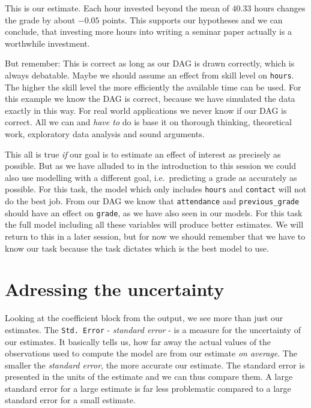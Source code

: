 \documentclass[
]{book}
\begin{document}
This is our estimate. Each hour invested beyond the mean of \(40.33\) hours
changes the grade by about \(-0.05\) points. This supports our hypotheses and we
can conclude, that investing more hours into writing a seminar paper actually
is a worthwhile investment.

But remember: This is correct as long as our DAG is drawn correctly, which is
always debatable. Maybe we should assume an effect from skill level on \texttt{hours}.
The higher the skill level the more efficiently the available time can be used.
For this example we know the DAG is correct, because we have simulated the data
exactly in this way. For real world applications we never know if our DAG is
correct. All we can and \emph{have to} do is base it on thorough thinking,
theoretical work, exploratory data analysis and sound arguments.

This all is true \emph{if} our goal is to estimate an effect of interest as precisely
as possible. But as we have alluded to in the introduction to this session we
could also use modelling with a different goal, i.e.~predicting a grade as
accurately as possible. For this task, the model which only includes \texttt{hours} and
\texttt{contact} will not do the best job. From our DAG we know that \texttt{attendance} and
\texttt{previous\_grade} should have an effect on \texttt{grade}, as we have also seen in our
models. For this task the full model including all these variables will produce
better estimates. We will return to this in a later session, but for now we
should remember that we have to know our task because the task dictates which is
the best model to use.

\hypertarget{adressing-the-uncertainty}{%
\section{Adressing the uncertainty}\label{adressing-the-uncertainty}}

Looking at the coefficient block from the output, we see more
than just our estimates. The \texttt{Std.\ Error} - \emph{standard error} - is a measure for the
uncertainty of our estimates. It basically tells us, how far away the actual
values of the observations used to compute the model are from our estimate
\emph{on average}. The smaller the \emph{standard error}, the more accurate our
estimate. The standard error is presented in the units of the estimate and we
can thus compare them. A large standard error for a large estimate is far less
problematic compared to a large standard error for a small estimate.
\end{document}
